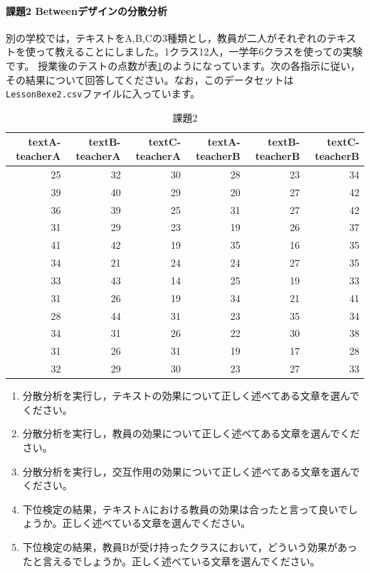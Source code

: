 \documentclass{ltjsarticle}
\begin{document}
\paragraph{課題2 Betweenデザインの分散分析}
別の学校では，テキストをA,B,Cの3種類とし，教員が二人がそれぞれのテキストを使って教えることにしました。1クラス12人，一学年6クラスを使っての実験です。
授業後のテストの点数が表\ref{L23::exe2}のようになっています。次の各指示に従い，その結果について回答してください。なお，このデータセットは\texttt{Lesson8exe2.csv}ファイルに入っています。
\begin{table}[ht]
  \centering
  \caption{課題2}
\begin{tabular}{rrrrrr}
  \hline
  textA-teacherA & textB-teacherA & textC-teacherA & textA-teacherB & textB-teacherB & textC-teacherB\\
  \hline
  25 & 32 & 30 & 28 & 23 & 34\\
  39 & 40 & 29 & 20 & 27 & 42\\
  36 & 39 & 25 & 31 & 27 & 42\\
  31 & 29 & 23 & 19 & 26 & 37\\
  41 & 42 & 19 & 35 & 16 & 35\\
  34 & 21 & 24 & 24 & 27 & 35\\
  33 & 43 & 14 & 25 & 19 & 33\\
  31 & 26 & 19 & 34 & 21 & 41\\
  28 & 44 & 31 & 23 & 35 & 34\\
  34 & 31 & 26 & 22 & 30 & 38\\
  31 & 26 & 31 & 19 & 17 & 28\\
  32 & 29 & 30 & 23 & 27 & 33\\
  \hline
  \end{tabular}
  \label{L23::exe2}
\end{table}

\begin{enumerate}
  \item 分散分析を実行し，テキストの効果について正しく述べてある文章を選んでください。
  \item 分散分析を実行し，教員の効果について正しく述べてある文章を選んでください。
  \item 分散分析を実行し，交互作用の効果について正しく述べてある文章を選んでください。
  \item 下位検定の結果，テキストAにおける教員の効果は合ったと言って良いでしょうか。正しく述べている文章を選んでください。
  \item 下位検定の結果，教員Bが受け持ったクラスにおいて，どういう効果があったと言えるでしょうか。正しく述べている文章を選んでください。
\end{enumerate}
\end{document}
